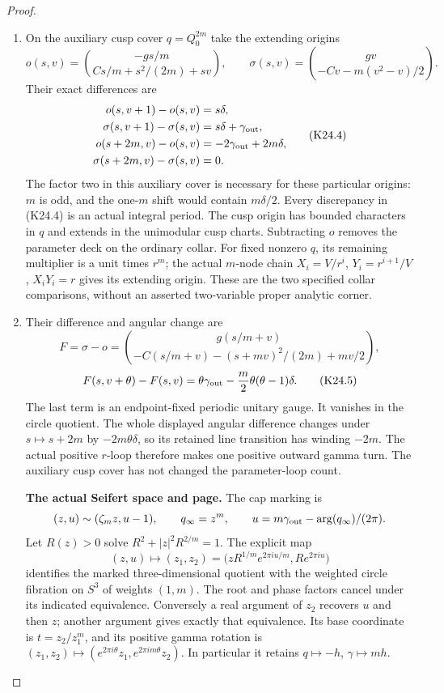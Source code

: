 \begin{proof}
\begin{enumerate}[label=\arabic*.]
\item On the auxiliary cusp cover $q=Q_0^{2m}$ take the extending origins
\[
 o(s,v)=\binom{-gs/m}{Cs/m+s^2/(2m)+sv},\qquad
 \sigma(s,v)=\binom{gv}{-Cv-m(v^2-v)/2}.
\]
Their exact differences are
\[
 \begin{aligned}
 o(s,v+1)-o(s,v)&=s\delta,\\
 \sigma(s,v+1)-\sigma(s,v)&=s\delta+\gamma_{\rm out},\\
 o(s+2m,v)-o(s,v)&=-2\gamma_{\rm out}+2m\delta,\\
 \sigma(s+2m,v)-\sigma(s,v)&=0.
 \end{aligned}                                                    \tag{K24.4}
\]
The factor two in this auxiliary cover is necessary for these
particular origins: $m$ is odd, and the one-$m$ shift would
contain $m\delta/2$. Every discrepancy in (K24.4) is an actual
integral period. The cusp origin has bounded characters in $q$
and extends in the unimodular cusp charts. Subtracting $o$
removes the parameter deck on the ordinary collar. For fixed
nonzero $q$, its remaining multiplier is a unit times $r^m$;
the actual $m$-node chain
$X_i=V/r^i$, $Y_i=r^{i+1}/V$, $X_iY_i=r$ gives its extending
origin. These are the two specified collar comparisons, without
an asserted two-variable proper analytic corner.

\item Their difference and angular change are
\[
 F=\sigma-o=
 \binom{g(s/m+v)}{-C(s/m+v)-(s+mv)^2/(2m)+mv/2},
\]
\[
 F(s,v+\theta)-F(s,v)
 =\theta\gamma_{\rm out}
          -\frac m2\theta(\theta-1)\delta.             \tag{K24.5}
\]
The last term is an endpoint-fixed periodic unitary gauge.
It vanishes in the circle quotient. The whole displayed angular
difference changes under $s\mapsto s+2m$ by $-2m\theta\delta$, so its retained
line transition has winding $-2m$. The actual positive $r$-loop
therefore makes one positive outward gamma turn. The auxiliary
cusp cover has not changed the parameter-loop count.

\par\medskip\noindent\textbf{The actual Seifert space and page.}
The cap marking is
\[
 (z,u)\sim(\zeta_mz,u-1),\qquad q_\infty=z^m,
 \qquad u=m\gamma_{\rm out}-\arg(q_\infty)/(2\pi).
\]
Let $R(z)>0$ solve $R^2+|z|^2R^{2/m}=1$. The explicit map
\[
 (z,u)\longmapsto
 (z_1,z_2)=
 \bigl(zR^{1/m}e^{2\pi iu/m},R e^{2\pi iu}\bigr)       \tag{K24.6}
\]
identifies the marked three-dimensional quotient with the
weighted circle fibration on $S^3$ of weights $(1,m)$.
The root and phase factors cancel under its indicated equivalence.
Conversely a real argument of $z_2$ recovers $u$ and then $z$;
another argument gives exactly that equivalence. Its base
coordinate is $t=z_2/z_1^m$, and its positive gamma rotation
is $(z_1,z_2)\mapsto(e^{2\pi i\theta}z_1,
e^{2\pi im\theta}z_2)$. In particular it retains
$q\mapsto-h$, $\gamma\mapsto mh$.


\end{enumerate}
\end{proof}
